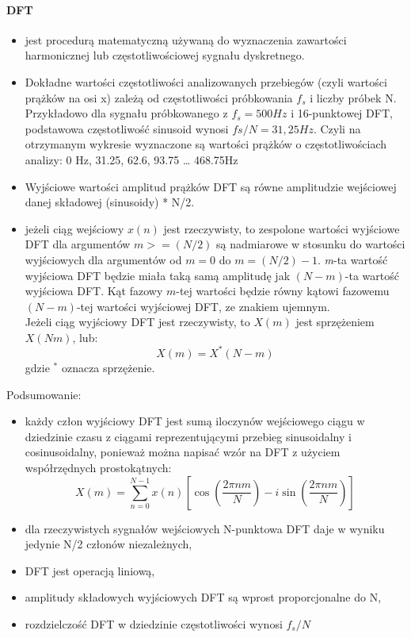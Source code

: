 \documentclass[a4paper,twoside]{report}
\begin{document}
\paragraph{DFT}
\begin{itemize}
	\item jest procedurą matematyczną używaną do wyznaczenia zawartości harmonicznej lub częstotliwościowej sygnału dyskretnego.
	\item Dokładne wartości częstotliwości analizowanych przebiegów (czyli wartości prążków na osi x) zależą od częstotliwości próbkowania $ f_s $ i liczby próbek N. Przykładowo dla sygnału próbkowanego z $ f_s = 500 Hz $  i 16-punktowej DFT, podstawowa częstotliwość sinusoid wynosi $ fs/N= 31,25 Hz$. Czyli na otrzymanym wykresie wyznaczone są wartości prążków o częstotliwościach analizy: 0 Hz, 31.25, 62.6, 93.75 … 468.75Hz
	\item Wyjściowe wartości amplitud prążków DFT są równe amplitudzie wejściowej danej składowej (sinusoidy) * N/2.
	\item jeżeli ciąg wejściowy $ x(n) $ jest rzeczywisty, to zespolone wartości wyjściowe DFT dla argumentów $ m >= (N/2) $ są nadmiarowe w stosunku do wartości wyjściowych dla argumentów od $ m = 0 $ do $ m = (N/2)-1 $. \textit{m}-ta wartość wyjściowa DFT będzie miała taką samą amplitudę jak $(N-m)$-ta wartość wyjściowa DFT. Kąt fazowy $m$-tej wartości będzie równy kątowi fazowemu $(N-m)$-tej wartości wyjściowej DFT, ze znakiem ujemnym. \\
	Jeżeli ciąg wyjściowy DFT jest rzeczywisty, to $X(m)$ jest sprzężeniem $X(Nm)$, lub:
	$$ X(m) = X^*(N-m) $$
	gdzie $ ^* $ oznacza sprzężenie.
\end{itemize}

Podsumowanie:
\begin{itemize}
	\item każdy człon wyjściowy DFT jest sumą iloczynów wejściowego ciągu w dziedzinie czasu z ciągami reprezentującymi przebieg sinusoidalny i cosinusoidalny, ponieważ można napisać wzór na DFT z użyciem współrzędnych prostokątnych:
	$$ X(m)= \sum_{n=0}^{N-1}{x(n) [\cos(\frac{2 \pi n m}{N}) - i \sin(\frac{2 \pi n m}{N})]}   $$
	\item dla rzeczywistych sygnałów wejściowych N-punktowa DFT daje w wyniku jedynie N/2 członów niezależnych,
	\item DFT jest operacją liniową,
	\item amplitudy składowych wyjściowych DFT są wprost proporcjonalne do N,
	\item rozdzielczość DFT w dziedzinie częstotliwości wynosi $ f_s/N $
\end{itemize}
\end{document}
